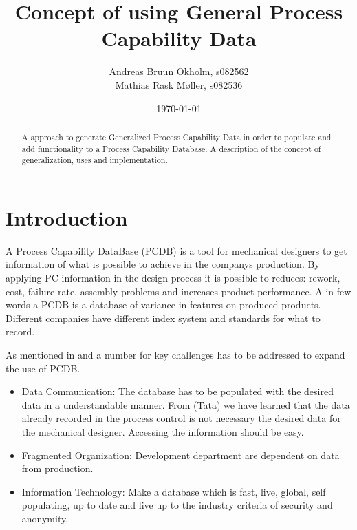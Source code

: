 \documentclass[aip,amsmath, reprint, author-year]{revtex4-1}
\begin{document}
\begin{abstract}
A approach to generate Generalized Process Capability Data in order to populate and add functionality to a Process Capability Database.
A description of the concept of generalization, uses and implementation.
\end{abstract}

\title{Concept of using General Process Capability Data}
\author{Andreas Bruun Okholm, s082562\\
Mathias Rask Møller, s082536 }
 
\date{\today}
\maketitle


\section{Introduction}

A Process Capability DataBase (PCDB)  is a tool for mechanical designers to get information of what is possible to achieve in the companys production. By applying PC information in the design process it is possible to reduces: rework, cost, failure rate, assembly problems and increases product performance.
A in few words a PCDB is a database of variance in features on produced products. Different companies have different index system and standards for what to record. 

As mentioned in \citep{tata1999process, tata1999effective, raskokholm} and a number for key challenges has to be addressed to expand the use of PCDB.
\begin{itemize}
	\item Data Communication: The database has to be populated with the desired data in a understandable manner. From (Tata) we have learned that the data already recorded in the process control is not necessary the desired data for the mechanical designer. Accessing the information should be easy.
	\item Fragmented Organization: Development department are dependent on data from production. 
	\item Information Technology: Make a database which is fast, live, global, self populating, up to date and live up to the industry criteria of security and anonymity.
\end{itemize}
\end{document}
